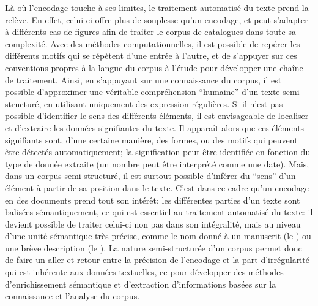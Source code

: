 Là où l'encodage touche  à ses limites, le traitement automatisé du texte prend la relève. En effet, celui-ci offre plus de souplesse qu'un encodage, et peut s'adapter à différents cas de figures afin de traiter le corpus de catalogues dans toute sa complexité. Avec des méthodes computationnelles, il est possible de repérer les différents motifs qui se répètent d'une entrée à l'autre, et de s'appuyer sur ces conventions propres à la langue du corpus à l'étude pour développer une chaîne de traitement. Ainsi, en s'appuyant sur une connaissance du corpus, il est possible d'approximer une véritable compréhension \enquote{humaine} d'un texte semi structuré, en utilisant uniquement des \glspl{expression régulière}. Si il n'est pas possible d'identifier le sens des différents éléments, il est envisageable de localiser et d'extraire les données signifiantes du texte. Il apparaît alors que ces éléments signifiants sont, d'une certaine manière, des formes, ou des motifs qui peuvent être détectés automatiquement; la signification peut être identifiée en fonction du type de donnée extraite (un nombre peut être interprété comme une date). Mais, dans un corpus semi-structuré, il est surtout possible d'inférer du \enquote{sens} d'un élément à partir de sa position dans le texte. C'est dans ce cadre qu'un encodage en \xmltei{} des documents prend tout son intérêt: les différentes parties d'un texte sont balisées sémantiquement, ce qui est essentiel au traitement automatisé du texte: il devient possible de traiter celui-ci non pas dans son intégralité, mais au niveau d'une unité sémantique très précise, comme le nom donné à un manuscrit (le \tname{}) ou une brève description (le \ttrait{}). La nature semi-structurée d'un corpus permet donc de faire un aller et retour entre la précision de l'encodage et la part d'irrégularité qui est inhérente aux données textuelles, ce pour développer des méthodes d'enrichissement sémantique et d'extraction d'informations basées sur la connaissance et l'analyse du corpus.

